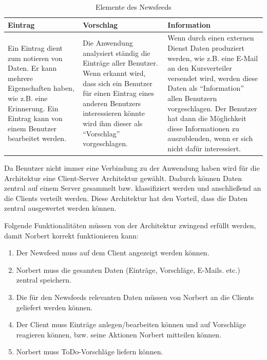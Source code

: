 \begin{table}[H]
    \centering
    \begin{tabularx}{\textwidth}{|X|X|X|}
            \toprule
            \textbf{Eintrag} & \textbf{Vorschlag} & \textbf{Information} \\
            \midrule
            \endhead
            Ein Eintrag dient zum notieren von Daten. Er kann mehrere Eigenschaften haben, wie z.B. eine Erinnerung.
            Ein Eintrag kann von einem Benutzer bearbeitet werden.
            &
            Die Anwendung analysiert ständig die Einträge aller Benutzer. Wenn erkannt wird, dass sich ein Benutzer
            für einen Eintrag eines anderen Benutzers interessieren könnte wird ihm dieser als \enquote{Vorschlag} vorgeschlagen.
            &
            Wenn durch einen externen Dienst Daten produziert werden, wie z.B. eine E-Mail an den Kursverteiler versendet wird,
            werden diese Daten als \enquote{Information} allen Benutzern vorgeschlagen.
            Der Benutzer hat dann die Möglichkeit diese Informationen zu auszublenden, wenn er sich nicht dafür interessiert.
            \\
            \hline
    \end{tabularx}
    \caption{Elemente des Newsfeeds}\label{overview:newsfeedelement}
\end{table}

Da Benutzer nicht immer eine Verbindung zu der Anwendung haben wird für die Architektur eine Client-Server Architektur gewählt.
Dadurch können Daten zentral auf einem Server gesammelt bzw. klassifiziert werden und anschließend an die Clients verteilt werden.
Diese Architektur hat den Vorteil, dass die Daten zentral ausgewertet werden können.

Folgende Funktionalitäten müssen von der Architektur zwingend erfüllt werden, damit Norbert korrekt funktionieren kann:
\begin{enumerate}
	\item Der Newsfeed muss auf dem Client angezeigt werden können.
	\item Norbert muss die gesamten Daten (Einträge, Vorschläge, E-Mails. etc.) zentral speichern.
	\item Die für den Newsfeeds relevanten Daten müssen von Norbert an die Clients geliefert werden können.
	\item Der Client muss Einträge anlegen/bearbeiten können und auf Vorschläge reagieren können, bzw. seine Aktionen Norbert mitteilen können.
	\item Norbert muss ToDo-Vorschläge liefern können.
\end{enumerate}


